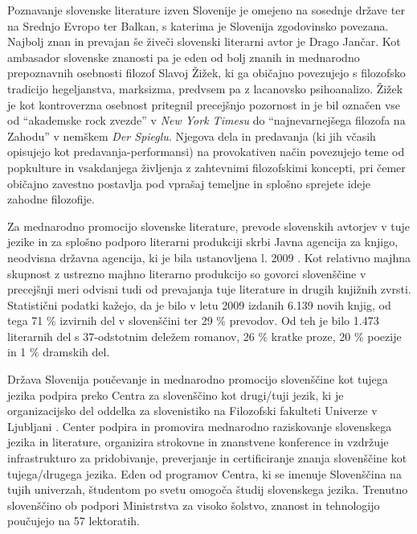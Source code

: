 \begin{multicols}{2}

Poznavanje slovenske literature izven Slovenije je omejeno na sosednje države ter na Srednjo Evropo ter Balkan, s katerima je Slovenija zgodovinsko povezana. Najbolj znan in prevajan še živeči slovenski literarni avtor je Drago Jančar. Kot ambasador slovenske znanosti pa je eden od bolj znanih in mednarodno prepoznavnih osebnosti filozof Slavoj Žižek, ki ga običajno povezujejo s filozofsko tradicijo hegeljanstva, marksizma, predvsem pa z lacanovsko psihoanalizo. Žižek je kot kontroverzna osebnost pritegnil precejšnjo pozornost in je bil označen vse od “akademske rock zvezde” v \textit{New York Timesu} do “najnevarnejšega filozofa na Zahodu” v nemškem \textit{Der Spieglu}. Njegova dela in predavanja (ki jih včasih opisujejo kot predavanja-performansi) na provokativen način povezujejo teme od popkulture in vsakdanjega življenja z zahtevnimi filozofskimi koncepti, pri čemer običajno zavestno postavlja pod vprašaj temeljne in splošno sprejete ideje zahodne filozofije.

Za mednarodno promocijo slovenske literature, prevode slovenskih avtorjev v tuje jezike in za splošno podporo literarni produkciji skrbi Javna agencija za knjigo, neodvisna državna agencija, ki je bila ustanovljena l. 2009 \cite{JAKRS1}.  Kot relativno majhna skupnost z ustrezno majhno literarno produkcijo so govor\-ci slovenščine v precejšnji meri odvisni tudi od prevajanja tuje literature in drugih knjižnih zvrsti. Statistični podatki kažejo, da je bilo v letu 2009 izdanih 6.139 novih knjig, od tega 71 \% izvirnih del v slovenščini ter 29 \% prevodov. Od teh je bilo 1.473 literarnih del s 37-odstotnim deležem romanov, 26 \% kratke proze, 20 \% poezije in 1 \% dramskih del.

Država Slovenija poučevanje in mednarodno promocijo slovenščine kot tujega jezika podpira preko Centra za slovenščino kot drugi/tuji jezik, ki je organizacijsko del oddelka za slovenistiko na Filozofski fakulteti Univerze v Ljubljani \cite{CSDTJ1}.  Center podpira in promovira mednarodno raziskovanje slovenskega jezika in literature, organizira strokovne in znanstvene konference in vzdržuje infrastrukturo za pridobivanje, preverjanje in certificiranje znanja slovenščine kot tujega/drugega jezika. Eden od programov Centra, ki se imenuje Slovenščina na tujih univerzah, študentom po svetu omogoča študij slovenskega jezika. Trenutno slovenščino ob podpori Ministrstva za visoko šolstvo, znanost in tehnologijo poučujejo na 57 lektoratih. 


\end{multicols}
